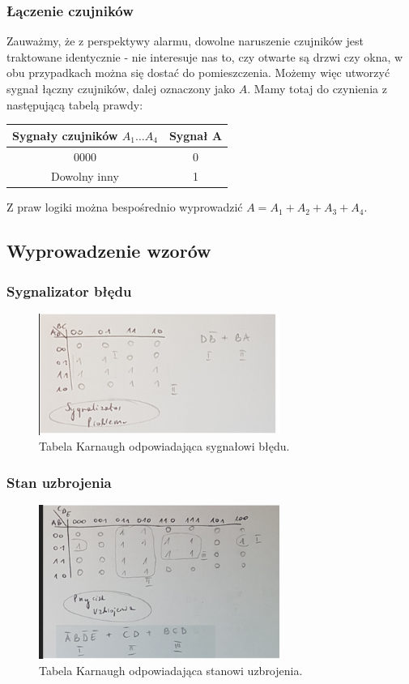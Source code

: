 \documentclass{article}
\begin{document}
\subsubsection{Łączenie czujników}
Zauważmy, że z perspektywy alarmu, dowolne naruszenie czujników jest traktowane identycznie - nie interesuje nas to, czy otwarte są drzwi czy okna, w obu przypadkach można się dostać do pomieszczenia. Możemy więc utworzyć sygnał łączny czujników, dalej oznaczony jako $A$.
Mamy totaj do czynienia z następującą tabelą prawdy: \\
\begin{center}
\begin{tabular}{c c}
Sygnały czujników $A_{1} \dots A_{4}$ & Sygnał A \\
\hline
0000 & 0 \\
Dowolny inny & 1
\end{tabular}
\end{center}
Z praw logiki można bespośrednio wyprowadzić $A = A_{1} + A_{2} + A_{3} + A_{4}$.
\subsection{Wyprowadzenie wzorów}
\subsubsection{Sygnalizator błędu}
\begin{figure}[H]
\includegraphics[width=0.7\textwidth]{error}
\caption{Tabela Karnaugh odpowiadająca sygnałowi błędu.}
\end{figure}
\subsubsection{Stan uzbrojenia}
\begin{figure}[H]
\includegraphics[width=0.7\textwidth]{alarm}
\caption{Tabela Karnaugh odpowiadająca stanowi uzbrojenia.}
\end{figure}
\end{document}
